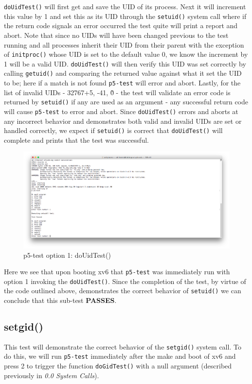 \documentclass[11pt,letterpaper]{report}
\begin{document}
	{\tt doUidTest()} will first get and save the UID of its process. Next it will increment this value by 1 and set this as its UID through the {\tt setuid()} system call where if the return code 
	signals an error occurred the test quite will print a report and abort. Note that since no UIDs will have been changed previous to the test running and all processes inherit their UID from their parent with the exception
	of {\tt initproc()} whose UID is set to the default value 0, we know the increment by 1 will be a valid UID. {\tt doUidTest()} will then verify this UID was set correctly by calling {\tt getuid()} and comparing the returned value against
	what it set the UID to be; here if a match is not found {\tt p5-test} will error and abort. Lastly, for the list of invalid UIDs -  32767+5, -41, \~0 - the test will validate an error code is returned
	by {\tt setuid()} if any are used as an argument - any successful return code will cause {\tt p5-test} to error and abort. Since {\tt doUidTest()} errors and aborts at any incorrect behavior and demonstrates both 
	valid and invalid UIDs are set or handled correctly, we expect if {\tt setuid()} is correct that {\tt doUidTest()} will complete and prints that the test was successful.
	
	
\begin{figure}[h!]
\centering
\includegraphics[width=0.8\linewidth]{douidtest.png}
\caption{p5-test option 1: doUidTest()}
\label{fig:datetest}
\end{figure}
	
	Here we see that upon booting xv6 that {\tt p5-test} was immediately run with option 1 invoking the {\tt doUidTest()}. Since the completion of the test, by virtue of the code outlined above, demonstrates
	the correct behavior of {\tt setuid()} we can conclude that this sub-test \textbf{PASSES}.
		
	\subsection{setgid()}
	This test will demonstrate the correct behavior of the {\tt setgid()} system call. To do this, we will run {\tt p5-test} immediately after the make and boot of xv6 
	and press 2 to trigger the function {\tt doGidTest()} with a null argument (described previously in \emph{0.0 System Calls}). 
\end{document}
